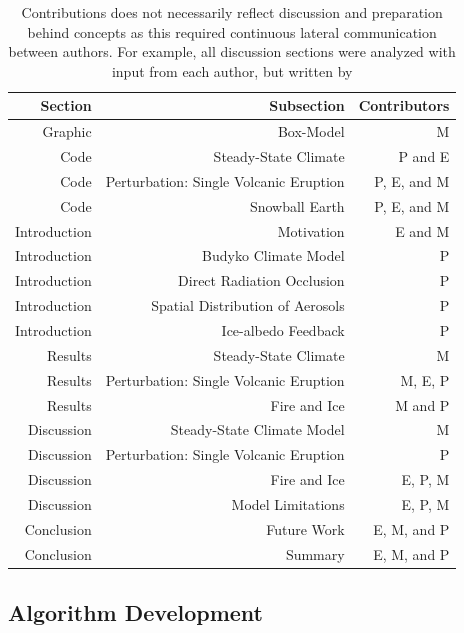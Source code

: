 \documentclass[12pt]{article}
\begin{document}
\begin{table}[H]
    \centering
    \begin{tabular}{rrr}
    Section & Subsection & Contributors \\
    \hline
    Graphic & Box-Model & M  \\
    Code & Steady-State Climate & P and E \\
    Code & Perturbation: Single Volcanic Eruption & P, E, and M \\
    Code & Snowball Earth & P, E, and M \\
    Introduction & Motivation & E and M \\
    Introduction & Budyko Climate Model & P \\
    Introduction & Direct Radiation Occlusion & P \\
    Introduction & Spatial Distribution of Aerosols & P \\
    Introduction & Ice-albedo Feedback & P \\ 
    Results & Steady-State Climate & M \\
    Results & Perturbation: Single Volcanic Eruption & M, E, P \\
    Results & Fire and Ice & M and P\\
    Discussion & Steady-State Climate Model & M \\
    Discussion & Perturbation: Single Volcanic Eruption & P \\
    Discussion & Fire and Ice & E, P, M\\
    Discussion & Model Limitations & E, P, M\\
    Conclusion & Future Work & E, M, and P \\
    Conclusion & Summary & E, M, and P \\
    \end{tabular}
    \caption{
        Contributions does not necessarily reflect discussion and preparation behind 
        concepts as this required continuous lateral communication between authors. 
        For example, all discussion sections were analyzed with
        input from each author, but written by
    }
    \label{tab:contributions}
\end{table}

\subsection{Algorithm Development}
\end{document}
